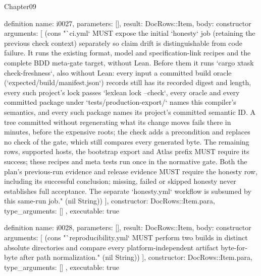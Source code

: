 \begin{lexlean}{Chapter09}
\begin{semanticmodule}
definition{
  name: i0027,
  parameters: [],
  result: DocRows::Item,
  body: constructor{
    arguments: [
      (cons "`ci.yml` MUST expose the initial `honesty` job (retaining the previous check context) separately so claim drift is distinguishable from code failure. It runs the existing format, model and specification-link recipes and the complete BDD meta-gate target, without Lean. Before them it runs `cargo xtask check-freshness`, also without Lean: every input a committed build oracle (`expected/build/manifest.json`) records still has its recorded digest and length, every such project's lock passes `lexlean lock --check`, every oracle and every committed package under `tests/production-export/` names this compiler's semantics, and every such package names its project's committed semantic ID. A tree committed without regenerating what its change moves fails there in minutes, before the expensive roots; the check adds a precondition and replaces no check of the gate, which still compares every generated byte. The remaining rows, supported hosts, the bootstrap export and Atlas prefix MUST require its success; these recipes and meta tests run once in the normative gate. Both the plan's previous-run evidence and release evidence MUST require the honesty row, including its successful conclusion; missing, failed or skipped honesty never establishes full acceptance. The separate `honesty.yml` workflow is subsumed by this same-run job." (nil String))
    ],
    constructor: DocRows::Item.para,
    type_arguments: []
  },
  executable: true
}

definition{
  name: i0028,
  parameters: [],
  result: DocRows::Item,
  body: constructor{
    arguments: [
      (cons "`reproducibility.yml` MUST perform two builds in distinct absolute directories and compare every platform-independent artifact byte-for-byte after path normalization." (nil String))
    ],
    constructor: DocRows::Item.para,
    type_arguments: []
  },
  executable: true
}


\end{semanticmodule}
\end{lexlean}
